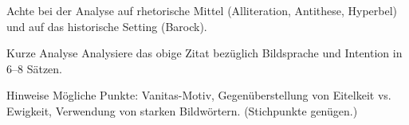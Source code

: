 \documentclass[11pt,a4paper,oneside]{article}
\begin{document}
	\begin{hinweis}
		Achte bei der Analyse auf rhetorische Mittel (Alliteration, Antithese, Hyperbel) und auf das historische Setting (Barock).
	\end{hinweis}
	
	\begin{aufgabe}{Kurze Analyse}
		Analysiere das obige Zitat bezüglich Bildsprache und Intention in 6–8 Sätzen.
	\end{aufgabe}
	
	\begin{loesung}{Hinweise}
		Mögliche Punkte: Vanitas-Motiv, Gegenüberstellung von Eitelkeit vs. Ewigkeit, Verwendung von starken Bildwörtern. (Stichpunkte genügen.)
	\end{loesung}
	
\end{document}
